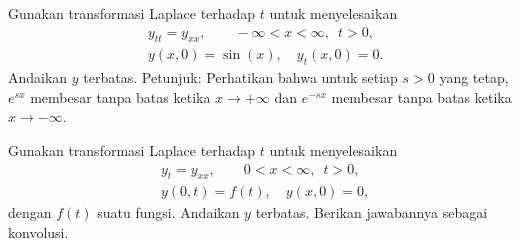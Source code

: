 \begin{exercise}
Gunakan transformasi Laplace terhadap $t$ untuk menyelesaikan
\begin{align*}
& y_{tt} = y_{xx}, \qquad -\infty < x < \infty, \enspace t > 0,\\
& y(x,0) = \sin(x), \quad  y_t(x,0) = 0 .
\end{align*}
Andaikan $y$ terbatas.
Petunjuk: Perhatikan bahwa untuk setiap $s > 0$ yang tetap,
$e^{sx}$ membesar tanpa batas ketika $x \to +\infty$
dan
$e^{-sx}$ membesar tanpa batas ketika $x \to -\infty$.
\end{exercise}

\begin{exercise}
Gunakan transformasi Laplace terhadap $t$ untuk menyelesaikan
\begin{align*}
& y_{t} = y_{xx}, \qquad 0 < x < \infty, \enspace t > 0,\\
& y(0,t) = f(t), \quad  y(x,0) = 0 ,
\end{align*}
dengan $f(t)$ suatu fungsi.
Andaikan $y$ terbatas.
Berikan jawabannya sebagai konvolusi.
\end{exercise}

